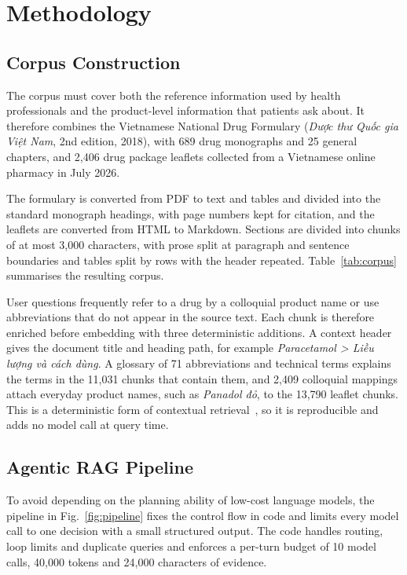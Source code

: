 \section{Methodology}\label{sec:method}
\suppressfloats[t]

\subsection{Corpus Construction}\label{sec:corpus}

The corpus must cover both the reference information used by health professionals and the product-level information that patients ask about. It therefore combines the Vietnamese National Drug Formulary (\textit{Dược thư Quốc gia Việt Nam}, 2nd edition, 2018), with 689 drug monographs and 25 general chapters, and 2{,}406 drug package leaflets collected from a Vietnamese online pharmacy in July 2026.

The formulary is converted from PDF to text and tables and divided into the standard monograph headings, with page numbers kept for citation, and the leaflets are converted from HTML to Markdown. Sections are divided into chunks of at most 3{,}000 characters, with prose split at paragraph and sentence boundaries and tables split by rows with the header repeated. Table~\ref{tab:corpus} summarises the resulting corpus.



User questions frequently refer to a drug by a colloquial product name or use abbreviations that do not appear in the source text. Each chunk is therefore enriched before embedding with three deterministic additions. A context header gives the document title and heading path, for example \textit{Paracetamol > Liều lượng và cách dùng}. A glossary of 71 abbreviations and technical terms explains the terms in the 11{,}031 chunks that contain them, and 2{,}409 colloquial mappings attach everyday product names, such as \textit{Panadol đỏ}, to the 13{,}790 leaflet chunks. This is a deterministic form of contextual retrieval~\cite{anthropic2024contextual}, so it is reproducible and adds no model call at query time.

\subsection{Agentic RAG Pipeline}\label{sec:pipeline}



To avoid depending on the planning ability of low-cost language models, the pipeline in Fig.~\ref{fig:pipeline} fixes the control flow in code and limits every model call to one decision with a small structured output. The code handles routing, loop limits and duplicate queries and enforces a per-turn budget of 10 model calls, 40{,}000 tokens and 24{,}000 characters of evidence.

